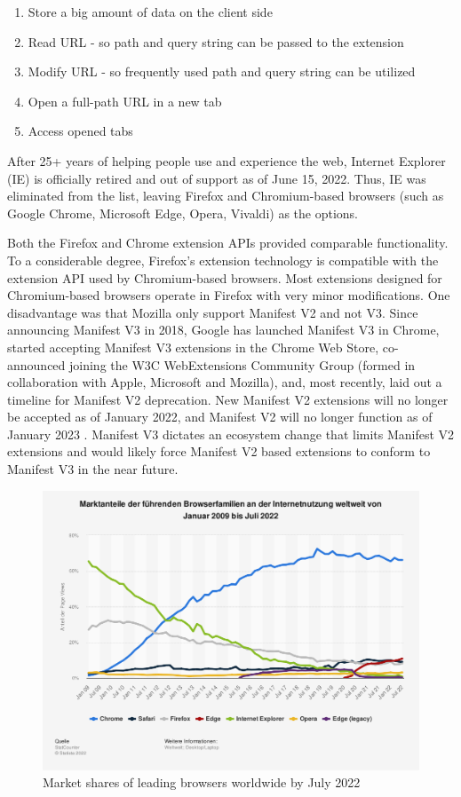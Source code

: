 \begin{enumerate}
  \item Store a big amount of data on the client side
  \item Read URL - so path and query string can be passed to the extension
  \item Modify URL - so frequently used path and query string can be utilized
  \item Open a full-path URL in a new tab
  \item Access opened tabs
\end{enumerate}

After 25+ years of helping people use and experience the web, Internet Explorer (IE) is officially retired and out of support as of June 15, 2022. Thus, IE was eliminated from the list, leaving Firefox and Chromium-based browsers (such as Google Chrome, Microsoft Edge, Opera, Vivaldi) as the options.

Both the Firefox and Chrome extension APIs provided comparable functionality. To a considerable degree, Firefox's extension technology is compatible with the extension API used by Chromium-based browsers. Most extensions designed for Chromium-based browsers operate in Firefox with very minor modifications. One disadvantage was that Mozilla only support Manifest V2 and not V3. Since announcing Manifest V3 in 2018, Google has launched Manifest V3 in Chrome, started accepting Manifest V3 extensions in the Chrome Web Store, co-announced joining the W3C WebExtensions Community Group (formed in collaboration with Apple, Microsoft and Mozilla), and, most recently, laid out a timeline for Manifest V2 deprecation. New Manifest V2 extensions will no longer be accepted as of January 2022, and Manifest V2 will no longer function as of January 2023 \autocite{alexei2021manifest}. Manifest V3 dictates an ecosystem change that limits Manifest V2 extensions and would likely force Manifest V2 based extensions to conform to Manifest V3 in the near future.

\begin{figure}[ht!]
  \includegraphics[width=\textwidth]{assets/statistic_id157944_marktanteile-fuehrender-browser-weltweit-bis-juli-2022.png}
  \caption{Market shares of leading browsers worldwide by July 2022}
  \label{fig:browserMarketShareChart}
\end{figure}

